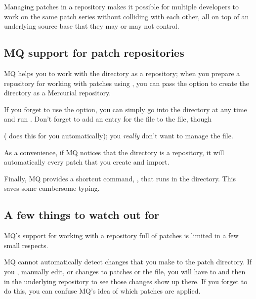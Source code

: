 Managing patches in a repository makes it possible for multiple
developers to work on the same patch series without colliding with
each other, all on top of an underlying source base that they may or
may not control.

\subsection{MQ support for patch repositories}

MQ helps you to work with the  directory as a
repository; when you prepare a repository for working with patches
using , you can pass the  option to
create the  directory as a Mercurial repository.

\begin{note}
  If you forget to use the  option, you can simply go
  into the  directory at any time and run
  .  Don't forget to add an entry for the
   file to the  file, though

  ( does this for you
  automatically); you \emph{really} don't want to manage the
   file.
\end{note}

As a convenience, if MQ notices that the 
directory is a repository, it will automatically  every
patch that you create and import.

Finally, MQ provides a shortcut command, , that runs
 in the  directory.  This saves
some cumbersome typing.

\subsection{A few things to watch out for}

MQ's support for working with a repository full of patches is limited
in a few small respects.

MQ cannot automatically detect changes that you make to the patch
directory.  If you , manually edit, or 
changes to patches or the  file, you will have to
 and then
 in the underlying repository to
see those changes show up there.  If you forget to do this, you can
confuse MQ's idea of which patches are applied.

